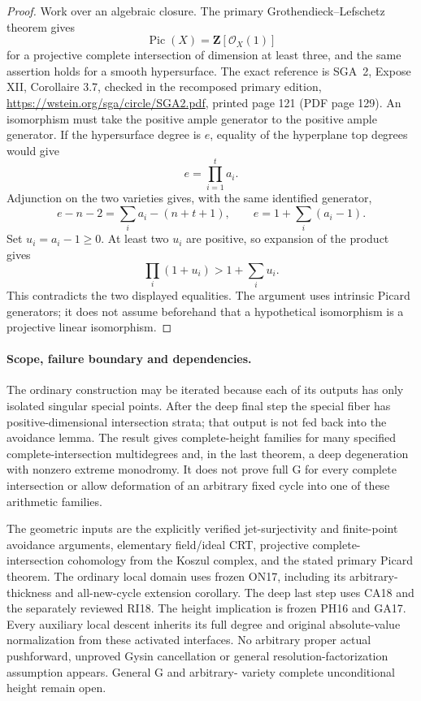 \begin{proof}
Work over an algebraic closure.  The primary
Grothendieck--Lefschetz theorem gives
\[
                    \operatorname{Pic}(X)=\mathbf Z[\mathcal O_X(1)]
\]
for a projective complete intersection of
dimension at least three, and the same assertion
holds for a smooth hypersurface.  The exact
reference is SGA~2, Expose XII, Corollaire 3.7,
checked in the recomposed primary edition,
\url{https://wstein.org/sga/circle/SGA2.pdf},
printed page 121 (PDF page 129).
An isomorphism must take the positive ample
generator to the positive ample generator.
If the hypersurface degree is $e$, equality of
the hyperplane top degrees would give
\[
                                e=\prod_{i=1}^t a_i.
\]
Adjunction on the two varieties gives, with
the same identified generator,
\[
 e-n-2=\sum_i a_i-(n+t+1),
             \qquad e=1+\sum_i(a_i-1).
\]
Set $u_i=a_i-1\ge0$.  At least two $u_i$
are positive, so expansion of the product
gives
\[
                    \prod_i(1+u_i)>1+\sum_i u_i.
\]
This contradicts the two displayed equalities.
The argument uses intrinsic Picard generators;
it does not assume beforehand that a hypothetical
isomorphism is a projective linear isomorphism.
\end{proof}

\paragraph{Scope, failure boundary and dependencies.}
The ordinary construction may be iterated because
each of its outputs has only isolated singular
special points.  After the deep final step the
special fiber has positive-dimensional intersection
strata; that output is not fed back into the
avoidance lemma.  The result gives complete-height
families for many specified complete-intersection
multidegrees and, in the last theorem, a deep
degeneration with nonzero extreme monodromy.
It does not prove full G for every complete
intersection or allow deformation of an arbitrary
fixed cycle into one of these arithmetic families.

The geometric inputs are the explicitly verified
jet-surjectivity and finite-point avoidance
arguments, elementary field/ideal CRT, projective
complete-intersection cohomology from the Koszul
complex, and the stated primary Picard theorem.
The ordinary local domain uses frozen ON17,
including its arbitrary-thickness and all-new-cycle
extension corollary.  The deep last step uses
CA18 and the separately reviewed RI18.  The
height implication is frozen PH16 and GA17.
Every auxiliary local descent inherits its full
degree and original absolute-value normalization
from these activated interfaces.  No arbitrary
proper actual pushforward, unproved Gysin
cancellation or general resolution-factorization
assumption appears.  General G and arbitrary-
variety complete unconditional height remain open.
